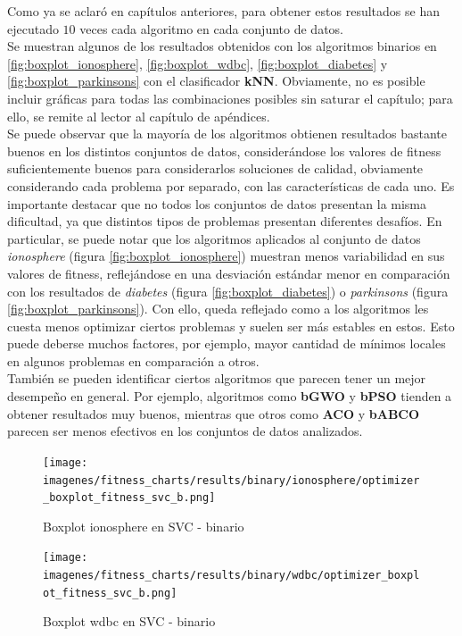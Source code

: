 Como ya se aclaró en capítulos anteriores, para obtener estos resultados se han ejecutado $10$ veces cada algoritmo en cada conjunto de datos.\\[6pt]
Se muestran algunos de los resultados obtenidos con los algoritmos binarios en \ref{fig:boxplot_ionosphere}, \ref{fig:boxplot_wdbc}, \ref{fig:boxplot_diabetes} y \ref{fig:boxplot_parkinsons} con el clasificador \textbf{kNN}. Obviamente, no es posible incluir gráficas para todas las combinaciones posibles sin saturar el capítulo; para ello, se remite al lector al capítulo de apéndices.\\[6pt]
Se puede observar que la mayoría de los algoritmos obtienen resultados bastante buenos en los distintos conjuntos de datos, considerándose los valores de fitness suficientemente buenos para considerarlos soluciones de calidad, obviamente considerando cada problema por separado, con las características de cada uno. Es importante destacar que no todos los conjuntos de datos presentan la misma dificultad, ya que distintos tipos de problemas presentan diferentes desafíos. En particular, se puede notar que los algoritmos aplicados al conjunto de datos \textit{ionosphere} (figura \ref{fig:boxplot_ionosphere}) muestran menos variabilidad en sus valores de fitness, reflejándose en una desviación estándar menor en comparación con los resultados de \textit{diabetes} (figura \ref{fig:boxplot_diabetes}) o \textit{parkinsons} (figura \ref{fig:boxplot_parkinsons}). Con ello, queda reflejado como a los algoritmos les cuesta menos optimizar ciertos problemas y suelen ser más estables en estos. Esto puede deberse muchos factores, por ejemplo, mayor cantidad de mínimos locales en algunos problemas en comparación a otros.\\[6pt]
También se pueden identificar ciertos algoritmos que parecen tener un mejor desempeño en general. Por ejemplo, algoritmos como \textbf{bGWO} y \textbf{bPSO} tienden a obtener resultados muy buenos, mientras que otros como \textbf{ACO} y \textbf{bABCO} parecen ser menos efectivos en los conjuntos de datos analizados.

\begin{figure}[htb]
    \centering
    \texttt{[image: imagenes/fitness\_charts/results/binary/ionosphere/optimizer\_boxplot\_fitness\_svc\_b.png]}
    \caption{Boxplot ionosphere en SVC - binario}
    \label{fig:boxplot_ionospheresvc}
\end{figure}

\begin{figure}[htb]
    \centering
    \texttt{[image: imagenes/fitness\_charts/results/binary/wdbc/optimizer\_boxplot\_fitness\_svc\_b.png]}
    \caption{Boxplot wdbc en SVC - binario}
    \label{fig:boxplot_wdbcsvc}
\end{figure}

